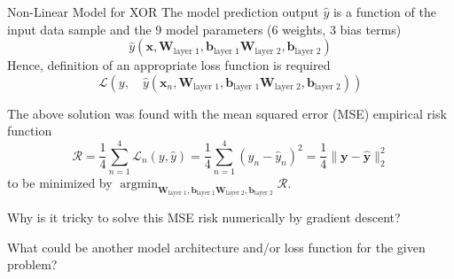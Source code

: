 \documentclass[mathserif, aspectratio=1610]{intbeamer}
\begin{document}
\begin{frame}[t]{Non-Linear Model for XOR}
The model prediction output $\hat{y}$ is a function of the input data sample and the 9 model parameters (6 weights, 3 bias terms)
$$
\hat{y}\left(\bm{x},\bm{W}_\text{layer 1}, \bm{b}_\text{layer 1}
\bm{W}_\text{layer 2}, \bm{b}_\text{layer 2}\right)
$$
Hence, definition of an appropriate loss function is required
$$
\mathcal{L}\left(y,\quad\hat{y}\left(\bm{x}_n, \bm{W}_\text{layer 1}, \bm{b}_\text{layer 1}
\bm{W}_\text{layer 2}, \bm{b}_\text{layer 2}\right)\right)
$$

The above solution was found with the mean squared error (MSE) empirical risk function
$$\mathcal{R} = \frac{1}{4}\sum_{n=1}^4 \mathcal{L}_n(y, \hat{y}) = \frac{1}{4}\sum_{n=1}^4 (y_n-\hat{y}_n)^2 = \frac{1}{4}\lVert\bm{y} - \hat{\bm{y}}\rVert_2^2$$
to be minimized by $\operatorname*{argmin}_{\bm{W}_\text{layer 1}, \bm{b}_\text{layer 1}
\bm{W}_\text{layer 2}, \bm{b}_\text{layer 2}} \mathcal{R}$.

Why is it tricky to solve this MSE risk numerically by gradient descent?

What could be another model architecture and/or loss function for the given problem?



\end{frame}
\end{document}
